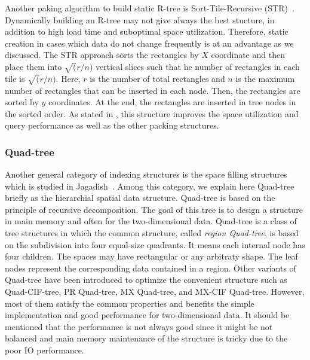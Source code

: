 \documentclass[a4paper,12pt]{article}
\begin{document}
Another paking algorithm to build static R-tree is Sort-Tile-Recursive (STR)~\cite{strtree}. Dynamically building an R-tree may not give always the best stucture, in addition to high load time and suboptimal space utilization. Therefore, static creation in cases which data do not change frequently is at an advantage as we discussed. The STR approach sorts the rectangles by $X$ coordinate and then place them into $\sqrt(r/n)$ vertical slices such that he number of rectangles in each tile is $\sqrt(r/n)$. Here, $r$ is the number of total rectangles and $n$ is the maximum number of rectangles that can be inserted in each node. Then, the rectangles are sorted by $y$ coordinates. At the end, the rectangles are inserted in tree nodes in the sorted order.
As stated in \cite{strtree}, this structure improves the space utilization and query performance as well as the other packing structures. 

\subsubsection{Quad-tree}
\label{quad-tree-based}
Another general category of indexing structures is the space filling structures which is studied in Jagadish~\cite{spacefilling}.
Among this category, we explain here Quad-tree~\cite{quadtree} briefly as the hierarchial spatial data structure. Quad-tree is based on the principle of recursive decomposition. The goal of this tree is to design a structure in main memory and often for the two-dimensional data. 
Quad-tree is a class of tree structures in which the common structure, called \textit{region Quad-tree}, is based on the subdivision into four equal-size quadrants. It means each internal node has four children. The spaces may have rectangular or any arbitraty shape. The leaf nodes represent the corresponding data contained in a region. 
Other variants of Quad-tree have been introduced to optimize the convenient structure such as Quad-CIF-tree, PR Quad-tree, MX Quad-tree, and MX-CIF Quad-tree. However, most of them satisfy the common properties and benefits the simple implementation and good performance for two-dimensional data.
It should be mentioned that the performance is not always good since it might be not balanced and main memory maintenance of the structure is tricky due to the poor IO performance. 
\end{document}
